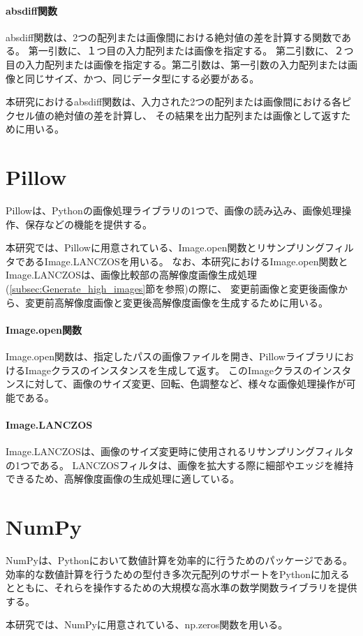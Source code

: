 \paragraph{absdiff関数}
absdiff関数は、2つの配列または画像間における絶対値の差を計算する関数である。
第一引数に、１つ目の入力配列または画像を指定する。
第二引数に、２つ目の入力配列または画像を指定する。第二引数は、第一引数の入力配列または画像と同じサイズ、かつ、同じデータ型にする必要がある。
\par
本研究におけるabsdiff関数は、入力された2つの配列または画像間における各ピクセル値の絶対値の差を計算し、
その結果を出力配列または画像として返すために用いる。

\section{Pillow}\label{sec:pillow}
Pillow\cite{Pillow}は、Python\cite{Python}の画像処理ライブラリの1つで、画像の読み込み、画像処理操作、保存などの機能を提供する。
\par
本研究では、Pillowに用意されている、Image.open関数とリサンプリングフィルタであるImage.LANCZOSを用いる。
なお、本研究におけるImage.open関数とImage.LANCZOSは、画像比較部の高解像度画像生成処理(\ref{subsec:Generate_high_images}節を参照)の際に、
変更前画像と変更後画像から、変更前高解像度画像と変更後高解像度画像を生成するために用いる。
\paragraph{Image.open関数}
Image.open関数\cite{ImageModule}は、指定したパスの画像ファイルを開き、PillowライブラリにおけるImageクラスのインスタンスを生成して返す。
このImageクラスのインスタンスに対して、画像のサイズ変更、回転、色調整など、様々な画像処理操作が可能である。
\paragraph{Image.LANCZOS}
Image.LANCZOSは、画像のサイズ変更時に使用されるリサンプリングフィルタの1つである\cite{LANCZOS}。
LANCZOSフィルタは、画像を拡大する際に細部やエッジを維持できるため、高解像度画像の生成処理に適している。
\par

\section{NumPy}\label{sec:numpy}
NumPy\cite{NumPy}は、Pythonにおいて数値計算を効率的に行うためのパッケージである。
効率的な数値計算を行うための型付き多次元配列のサポートをPythonに加えるとともに、それらを操作するための大規模な高水準の数学関数ライブラリを提供する。
\par
本研究では、NumPyに用意されている、np.zeros関数を用いる。
